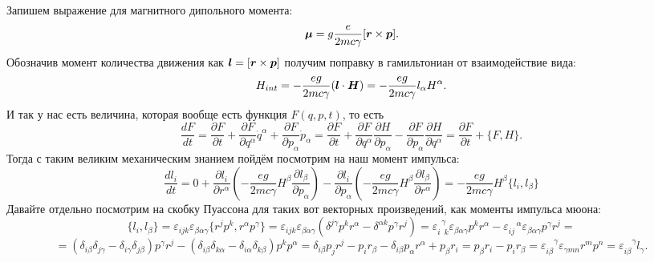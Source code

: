 Запишем выражение для магнитного дипольного момента:
\begin{equation*}
	\mbox{\boldmath $\mu$} = g \frac{e}{2 m c \gamma} [\mbox{\boldmath $r$}\times \mbox{\boldmath $p$}].
\end{equation*}
Обозначив момент количества движения как $\mbox{\boldmath $l$} = [\mbox{\boldmath $r$}\times \mbox{\boldmath $p$}]$ получим поправку в гамильтониан от взаимодействие вида:
\begin{equation*}
	H_{int} = - \frac{e g}{2 m c \gamma} (\mbox{\boldmath $l$} \cdot \mbox{\boldmath $H$}) = - \frac{e g}{2 m c \gamma} l_\alpha H^\alpha.
\end{equation*}
И так у нас есть величина, которая вообще есть функция $F(q,p,t)$, то есть
\begin{equation*}
	\frac{d F}{d t} = \frac{\partial F}{\partial t} + \frac{\partial F}{\partial q^\alpha} \dot{q}^\alpha + \frac{\partial F}{\partial p_\alpha} \dot{p}_\alpha
	=
	\frac{\partial F}{\partial t} + \frac{\partial F}{\partial q^\alpha} \frac{\partial H}{\partial p_\alpha} - \frac{\partial F}{\partial p_\alpha} \frac{\partial H}{\partial q^\alpha} = \frac{\partial F}{\partial t} + \{F, H\}.
\end{equation*}
Тогда с таким великим механическим знанием пойдём посмотрим на наш момент импульса:
\begin{equation*}
	\frac{d l_i}{d t} = 0 + \frac{\partial l_i}{\partial r^\alpha} \left(- \frac{e g}{2 m c \gamma} H^\beta \frac{\partial l_\beta}{\partial p_\alpha}\right) - \frac{\partial l_i}{\partial p_\alpha} \left(- \frac{e g}{2 m c \gamma} H^\beta \frac{\partial l_\beta}{\partial r^\alpha}\right)
	= - \frac{e g}{2 m c \gamma} H^\beta \{l_i, l_\beta\}
\end{equation*}
Давайте отдельно посмотрим на скобку Пуассона для таких вот векторных произведений, как моменты импульса мюона:
\begin{equation*}
	\{l_i, l_\beta\} = \varepsilon_{i j k} \varepsilon_{\beta\alpha\gamma} \{r^j p^k, r^\alpha p^\gamma\} 
	=
	\varepsilon_{i j k} \varepsilon_{\beta\alpha\gamma} (\delta^{j \gamma} p^k r^\alpha - \delta^{\alpha k} p^\gamma r^j) 
	= 
	\varepsilon_{i \phantom{0} k}^{\phantom{0} \gamma} \varepsilon_{\beta\alpha\gamma} p^k r^\alpha - \varepsilon_{i j}^{\phantom{0} \phantom{0}\alpha} \varepsilon_{\beta\alpha\gamma} p^\gamma r^j
	=
\end{equation*}
\begin{equation*}
	= (\delta_{i \beta} \delta_{j \gamma} - \delta_{i \gamma} \delta_{j \beta}) p^\gamma r^j - (\delta_{i \beta} \delta_{k \alpha} - \delta_{i \alpha} \delta_{k \beta})p^k p^\alpha
	=
	\delta_{i \beta} p_j r^j - p_i r_\beta - \delta_{i \beta} p_\alpha r^\alpha + p_\beta r_i 
	=
	p_\beta r_i -p_i r_\beta = \varepsilon_{i \beta}^{\phantom{0}\phantom{0}\gamma} \varepsilon_{\gamma m n} r^m p^n = \varepsilon_{i \beta}^{\phantom{0}\phantom{0}\gamma}  l_\gamma.
\end{equation*}
